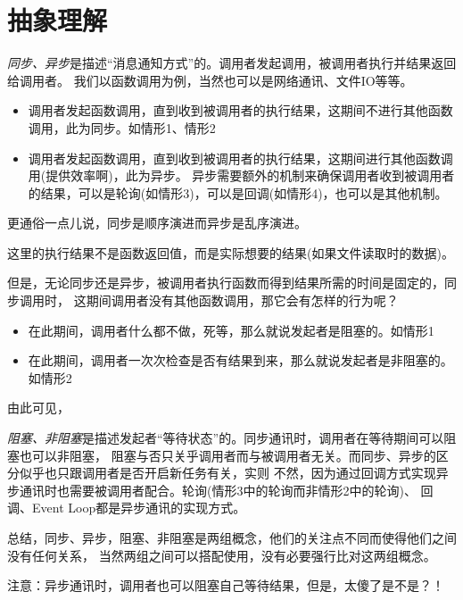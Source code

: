 \documentclass[a4paper,11pt]{article}
\begin{document}
\section[抽象理解]{抽象理解}
\emph{同步、异步}是描述“消息通知方式”的。调用者发起调用，被调用者执行并结果返回给调用者。
我们以函数调用为例，当然也可以是网络通讯、文件IO等等。
\begin{itemize}
  \item 调用者发起函数调用，直到收到被调用者的执行结果，这期间不进行其他函数调用，此为同步。如情形1、情形2
  \item 调用者发起函数调用，直到收到被调用者的执行结果，这期间进行其他函数调用(提供效率啊)，此为异步。
        异步需要额外的机制来确保调用者收到被调用者的结果，可以是轮询(如情形3)，可以是回调(如情形4)，也可以是其他机制。
\end{itemize}
更通俗一点儿说，同步是顺序演进而异步是乱序演进。

这里的执行结果不是函数返回值，而是实际想要的结果(如果文件读取时的数据)。

但是，无论同步还是异步，被调用者执行函数而得到结果所需的时间是固定的，同步调用时，
这期间调用者没有其他函数调用，那它会有怎样的行为呢？
\begin{itemize}
  \item 在此期间，调用者什么都不做，死等，那么就说发起者是阻塞的。如情形1
  \item 在此期间，调用者一次次检查是否有结果到来，那么就说发起者是非阻塞的。如情形2
\end{itemize}
由此可见，

\emph{阻塞、非阻塞}是描述发起者“等待状态”的。同步通讯时，调用者在等待期间可以阻塞也可以非阻塞，
阻塞与否只关乎调用者而与被调用者无关。而同步、异步的区分似乎也只跟调用者是否开启新任务有关，实则
不然，因为通过回调方式实现异步通讯时也需要被调用者配合。轮询(情形3中的轮询而非情形2中的轮询)、
回调、Event Loop都是异步通讯的实现方式。

总结，同步、异步，阻塞、非阻塞是两组概念，他们的关注点不同而使得他们之间没有任何关系，
当然两组之间可以搭配使用，没有必要强行比对这两组概念。

注意：异步通讯时，调用者也可以阻塞自己等待结果，但是，太傻了是不是？！
\end{document}
